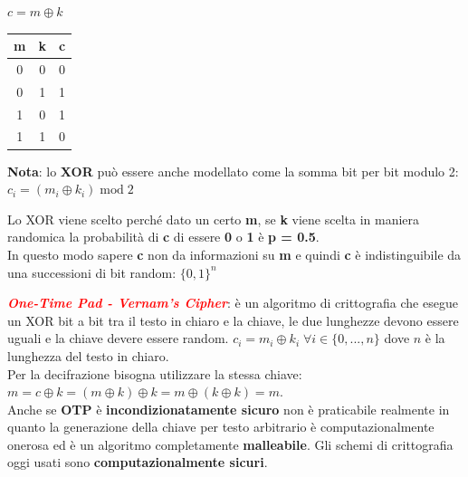 \begin{center}
    \begin{minipage}[c]{0.3\textwidth}
        \centering
        $c = m \oplus k$
    \end{minipage}
    \begin{minipage}[c]{0.3\textwidth}
        \centering
        \begin{tabular}{|c|c|c|}
            \hline
            \textbf{m} & \textbf{k} & \textbf{c} \\ \hline
            0 & 0 & 0 \\ \hline
            0 & 1 & 1 \\ \hline
            1 & 0 & 1 \\ \hline
            1 & 1 & 0 \\ \hline
        \end{tabular}
    \end{minipage}
    \begin{minipage}[c]{0.3\textwidth}
        \centering
        \textbf{Nota}: lo \textbf{XOR} può essere anche modellato come la somma bit per bit modulo 2: $c_i = (m_i \oplus k_i) \; \text{mod} \; 2$
    \end{minipage}
\end{center}

\begin{flushleft}
    Lo XOR viene scelto perché dato un certo \textbf{m}, se \textbf{k} viene scelta in maniera randomica la probabilità di \textbf{c} di essere \textbf{0} o \textbf{1} è \textbf{p = 0.5}. \\
    In questo modo sapere \textbf{c} non da informazioni su \textbf{m} e quindi \textbf{c} è indistinguibile da una successioni di bit random: $\{0, 1\}^n$
\end{flushleft}

\begin{flushleft}
    \textcolor{red}{\textbf{\textit{One-Time Pad - Vernam's Cipher}}}: è un algoritmo di crittografia che esegue un XOR bit a bit tra il testo in chiaro e la chiave, le due lunghezze devono essere uguali e la chiave devere essere random. $c_i = m_i \oplus k_i \; \forall i \in \{0, ..., n\}$ dove $n$ è la lunghezza del testo in chiaro. \\
    Per la decifrazione bisogna utilizzare la stessa chiave: $m = c \oplus k = (m \oplus k) \oplus k = m \oplus (k \oplus k) = m$. \\
    Anche se \textbf{OTP} è \textbf{incondizionatamente sicuro} non è praticabile realmente in quanto la generazione della chiave per testo arbitrario è computazionalmente onerosa ed è un algoritmo completamente \textbf{malleabile}. Gli schemi di crittografia oggi usati sono \textbf{computazionalmente sicuri}.
\end{flushleft}


